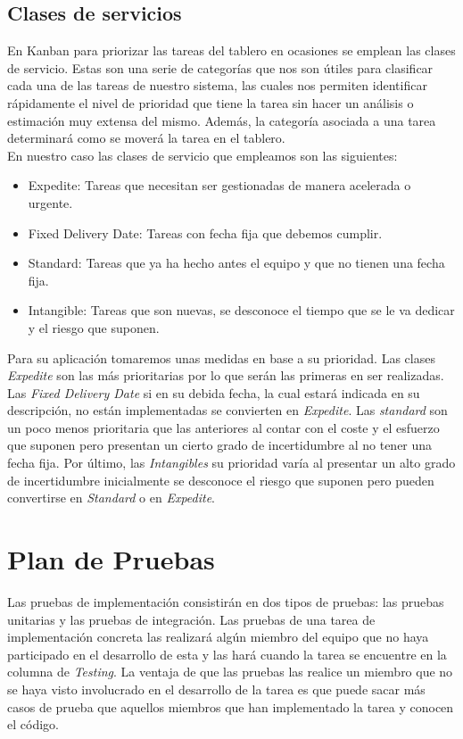 \subsection{Clases de servicios}
\label{claseDeServicio}
En Kanban para priorizar las tareas del tablero en ocasiones se emplean las clases de servicio. Estas son una serie de categorías que nos son útiles para clasificar cada una de las tareas de nuestro sistema, las cuales nos permiten identificar rápidamente el nivel de prioridad que tiene la tarea sin hacer un análisis o estimación muy extensa del mismo. Además, la categoría asociada a una tarea determinará como se moverá la tarea en el tablero.\\
En nuestro caso las clases de servicio que empleamos son las siguientes:
\begin{itemize}
    \item Expedite: Tareas que necesitan ser gestionadas de manera acelerada o urgente.
    \item Fixed Delivery Date: Tareas con fecha fija que debemos cumplir.
    \item Standard: Tareas que ya ha hecho antes el equipo y que no tienen una fecha fija.
    \item Intangible: Tareas que son nuevas, se desconoce el tiempo que se le va dedicar y el riesgo que suponen.
\end{itemize}
Para su aplicación tomaremos unas medidas en base a su prioridad. Las clases \textit{Expedite} son las más prioritarias por lo que serán las primeras en ser realizadas. Las \textit{Fixed Delivery Date} si en su debida fecha, la cual estará indicada en su descripción, no están implementadas se convierten en \textit{Expedite}. Las \textit{standard} son un poco menos prioritaria que las anteriores al contar con el coste y el esfuerzo que suponen pero presentan un cierto grado de incertidumbre al no tener una fecha fija. Por último, las \textit{Intangibles} su prioridad varía al presentar un alto grado de incertidumbre inicialmente se desconoce el riesgo que suponen pero pueden convertirse en \textit{Standard} o en \textit{Expedite}.

\section{Plan de Pruebas}
\label{cap:pruebas}
\nocite{pipelineRedHat}
\nocite{testingSW}
\nocite{ciAmazon}

Las pruebas de implementación consistirán en dos tipos de pruebas: las pruebas unitarias y las pruebas de integración. Las pruebas de una tarea de implementación concreta las realizará algún miembro del equipo que no haya participado en el desarrollo de esta y las hará cuando la tarea se encuentre en la columna de \textit{Testing}. La ventaja de que las pruebas las realice un miembro que no se haya visto involucrado en el desarrollo de la tarea es que puede sacar más casos de prueba que aquellos miembros que han implementado la tarea y conocen el código.


